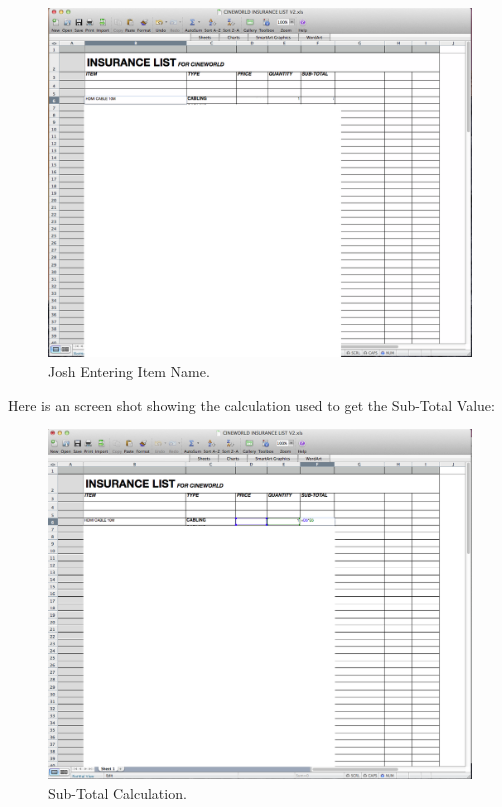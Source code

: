\begin{figure}[H]
    \includegraphics[width=\textwidth]{./Analysis/Forms/enter_data.png}
    \caption{Josh Entering Item Name.} \label{fig:print_function_result}
\end{figure}

\newpage

\noindent Here is an screen shot showing the calculation used to get the Sub-Total Value:

\begin{figure}[H]
    \includegraphics[width=\textwidth]{./Analysis/Forms/sub_total_calc.png}
    \caption{Sub-Total Calculation.} \label{fig:print_function_result}
\end{figure}\\

